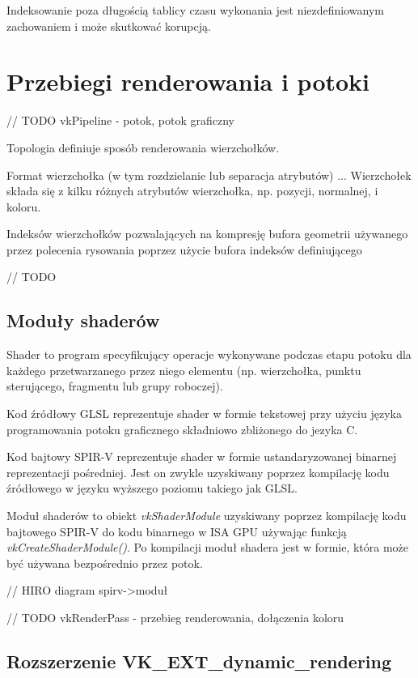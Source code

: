 Indeksowanie poza długością tablicy czasu wykonania jest niezdefiniowanym zachowaniem i może skutkować korupcją.

\section{Przebiegi renderowania i potoki}

// TODO vkPipeline - potok, potok graficzny


Topologia definiuje sposób renderowania wierzchołków.

Format wierzchołka (w tym rozdzielanie lub separacja atrybutów) ...
Wierzchołek składa się z kilku różnych atrybutów wierzchołka, np. pozycji, normalnej, i koloru.

Indeksów wierzchołków pozwalających na kompresję bufora geometrii używanego przez polecenia rysowania poprzez użycie bufora indeksów definiującego 

// TODO

\subsection{Moduły shaderów}

Shader to program specyfikujący operacje wykonywane podczas etapu potoku dla każdego przetwarzanego przez niego elementu (np. wierzchołka, punktu sterującego, fragmentu lub grupy roboczej).

Kod źródłowy GLSL reprezentuje shader w formie tekstowej przy użyciu języka programowania potoku graficznego składniowo zbliżonego do jezyka C.

Kod bajtowy SPIR-V reprezentuje shader w formie ustandaryzowanej binarnej reprezentacji pośredniej. Jest on zwykle uzyskiwany poprzez kompilację kodu źródłowego w języku wyższego poziomu takiego jak GLSL.

Moduł shaderów to obiekt \textit{vkShaderModule} uzyskiwany poprzez kompilację kodu bajtowego SPIR-V do kodu binarnego w ISA GPU używając funkcją \textit{vkCreateShaderModule()}.
Po kompilacji moduł shadera jest w formie, która może być używana bezpośrednio przez potok.

// HIRO diagram spirv->moduł

// TODO vkRenderPass - przebieg renderowania, dołączenia koloru

\subsection{Rozszerzenie VK\_EXT\_dynamic\_rendering}

